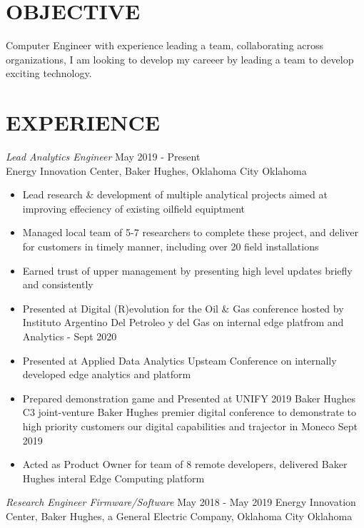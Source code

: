\documentclass[line,margin]{res}
\begin{document}
\address{sammgtanner@gmail.com}
\address{(208) 830-1983}


\begin{resume}

	\section{OBJECTIVE}
	Computer Engineer with experience leading a team, collaborating across organizations, I am looking to develop my careeer by leading a team to develop exciting technology.

	\section{EXPERIENCE}
	 {\sl Lead Analytics Engineer} \hfill May 2019 - Present \\
	Energy Innovation Center, Baker Hughes, Oklahoma City Oklahoma
	\begin{itemize} \itemsep -2pt
		\item Lead research \& development of multiple analytical projects aimed at improving effeciency of existing oilfield equiptment
		\item Managed local team of 5-7 researchers to complete these project, and deliver for customers in timely manner, including over 20 field installations
		\item Earned trust of upper management by presenting high level updates briefly and consistently
		\item Presented at Digital (R)evolution for the Oil \& Gas conference hosted by Instituto Argentino Del Petroleo y del Gas on internal edge platfrom and Analytics - Sept 2020
		\item Presented at Applied Data Analytics Upsteam Conference on internally developed edge analytics and platform
		\item Prepared demonstration game and Presented at UNIFY 2019 Baker Hughes C3 joint-venture Baker Hughes premier digital conference to demonstrate to high priority customers our digital capabilities and trajector in Moneco Sept 2019
		\item Acted as Product Owner for team of 8 remote developers, delivered Baker Hughes interal Edge Computing platform
	\end{itemize}
	{\sl Research Engineer Firmware/Software} \hfill May 2018 - May 2019
	Energy Innovation Center, Baker Hughes, a General Electric Company, Oklahoma City Oklahoma

\end{resume}
\end{document}
